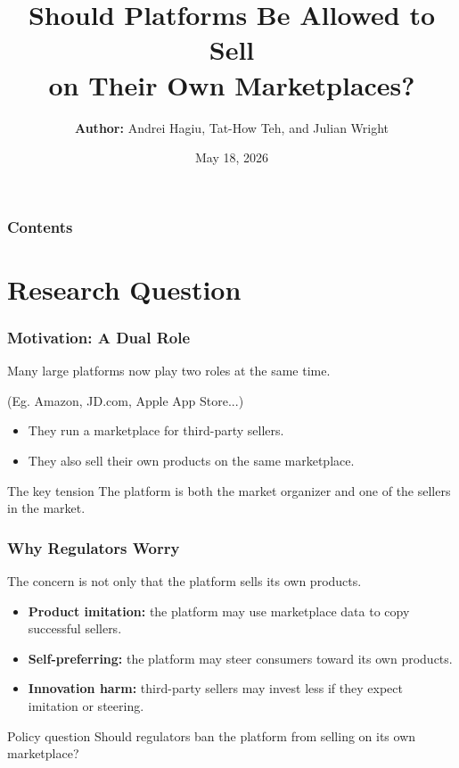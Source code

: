 \documentclass[aspectratio=169,AutoFakeBold,AutoFakeSlant]{beamer}
\title[Platform Dual Mode]{
  Should Platforms Be Allowed to Sell\\
  on Their Own Marketplaces?}
\author[Group 1]{
  \textbf{Author:} Andrei Hagiu, Tat-How Teh, and Julian Wright
  \texorpdfstring{\\\medskip {\small \textbf{Reporter:} Group 1}}{}
}
\institute[Sun Yat-Sen University]{
  Sun Yat-Sen University}
\date[May 18, 2026]{May 18, 2026}
\begin{document}
\begin{frame}
  \titlepage
\end{frame}
\setcounter{framenumber}{0}

\begin{frame}
  \frametitle{Contents}
  \tableofcontents[hideallsubsections]
\end{frame}

\section{Research Question}

\begin{frame}
  \frametitle{Motivation: A Dual Role}
  \small
  Many large platforms now play two roles at the same time.
  
  (Eg. Amazon, JD.com, Apple App Store...)

  \begin{itemize}
    \item They run a marketplace for third-party sellers.
    \item They also sell their own products on the same marketplace.
  \end{itemize}

  \begin{block}{The key tension}
    The platform is both the market organizer and one of the sellers in the market.
  \end{block}
\end{frame}

\begin{frame}
  \frametitle{Why Regulators Worry}
  \small
  The concern is not only that the platform sells its own products.

  \begin{itemize}
    \item \textbf{Product imitation:} the platform may use marketplace data to copy successful sellers.
    \item \textbf{Self-preferring:} the platform may steer consumers toward its own products.
    \item \textbf{Innovation harm:} third-party sellers may invest less if they expect imitation or steering.
  \end{itemize}

  \begin{alertblock}{Policy question}
    Should regulators ban the platform from selling on its own marketplace?
  \end{alertblock}
\end{frame}
\end{document}
